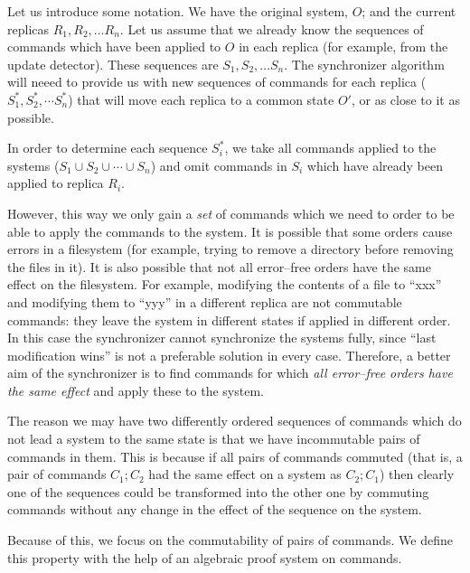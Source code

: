 Let us introduce some notation. We have the original system, \(O\); 
and the current replicas \(R_1, R_2, \ldots R_n\).
Let us assume that we already know the sequences of commands which have been applied to
\(O\) in each replica (for example, from the update detector). These
sequences are
\(S_1, S_2, \ldots S_n\). The synchronizer algorithm will neeed to provide us
with new sequences of commands for each replica (\(S_1^*, S_2^*, \cdots S_n^*\))
that will move each
replica to a common state \(O'\), or as close to it as possible.

In order to determine each sequence \(S_i^*\), we take all commands
applied
to the systems (\(S_1\cup S_2\cup \cdots\cup S_n\)) and omit commands
in \(S_i\) which have already been applied to replica \(R_i\). 

However, this way we only gain a \emph{set} of commands which we
need to order to be able to apply the commands to the
system. It is possible that some orders cause errors in a filesystem
(for example, trying to remove a directory before removing the files in
it). It is also possible that not all error--free orders have the same
effect on the filesystem. For example, modifying the contents of a file to
``xxx'' and modifying them to ``yyy'' in a different replica are not commutable commands: they
leave the system in different states if applied in different order.
In this case the synchronizer cannot synchronize the systems fully, since
``last modification wins'' is not a preferable solution in every case.  
Therefore, a better aim of the synchronizer is to find commands for which 
\emph{all error--free orders have
the same effect} and apply these to the system.

The reason we may have two differently ordered sequences of commands which
do not lead a system to the same state is that we have incommutable pairs
of commands in them. This is because if all pairs of commands
commuted (that is, a pair of commands \(C_1; C_2\) had the same effect on
a system as \(C_2; C_1\)) then clearly one of the sequences could be
transformed into the other one by commuting commands
without any change in the effect of the sequence on the system. 

Because of this, we focus on the commutability of pairs of commands.  
We define this property with the help of an algebraic 
proof system on commands.%


